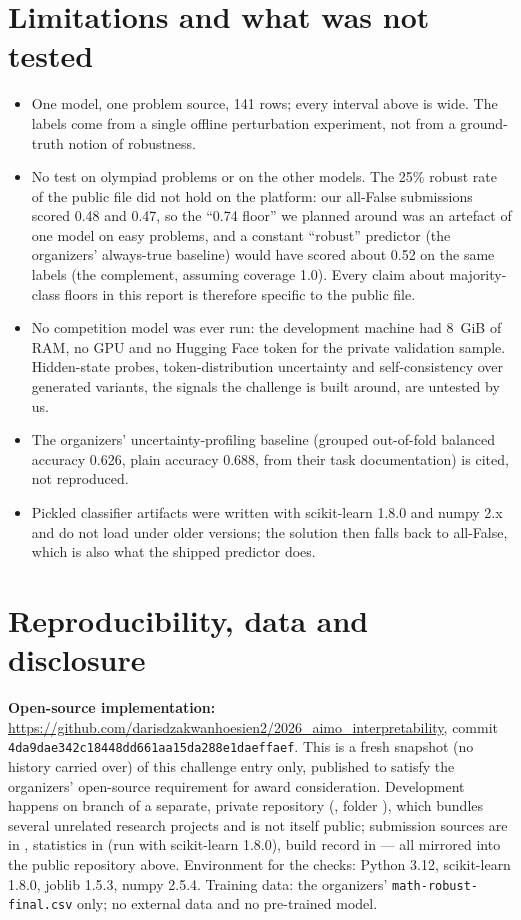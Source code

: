 \documentclass{article}
\begin{document}
\section{Limitations and what was not tested}
\begin{itemize}\setlength\itemsep{0pt}
\item One model, one problem source, 141 rows; every interval above is wide. The labels come from a single offline perturbation experiment, not from a ground-truth notion of robustness.
\item No test on olympiad problems or on the other models. The 25\% robust rate of the public file did not hold on the platform: our all-False submissions scored 0.48 and 0.47, so the ``0.74 floor'' we planned around was an artefact of one model on easy problems, and a constant ``robust'' predictor (the organizers' always-true baseline) would have scored about 0.52 on the same labels (the complement, assuming coverage 1.0). Every claim about majority-class floors in this report is therefore specific to the public file.
\item No competition model was ever run: the development machine had 8~GiB of RAM, no GPU and no Hugging Face token for the private validation sample. Hidden-state probes, token-distribution uncertainty and self-consistency over generated variants, the signals the challenge is built around, are untested by us.
\item The organizers' uncertainty-profiling baseline (grouped out-of-fold balanced accuracy 0.626, plain accuracy 0.688, from their task documentation) is cited, not reproduced.
\item Pickled classifier artifacts were written with scikit-learn 1.8.0 and numpy 2.x and do not load under older versions; the solution then falls back to all-False, which is also what the shipped predictor does.
\end{itemize}

\section{Reproducibility, data and disclosure}
\textbf{Open-source implementation:} \url{https://github.com/darisdzakwanhoesien2/2026_aimo_interpretability}, commit \texttt{4da9dae342c18448dd661aa15da288e1daeffaef}. This is a fresh snapshot (no history carried over) of this challenge entry only, published to satisfy the organizers' open-source requirement for award consideration.
Development happens on branch  of a separate, private repository (, folder ), which bundles several unrelated research projects and is not itself public; submission sources are in , statistics in  (run with scikit-learn 1.8.0), build record in  --- all mirrored into the public repository above.
Environment for the checks: Python 3.12, scikit-learn 1.8.0, joblib 1.5.3, numpy 2.5.4. Training data: the organizers' \texttt{math-robust-final.csv} only; no external data and no pre-trained model.
\end{document}
